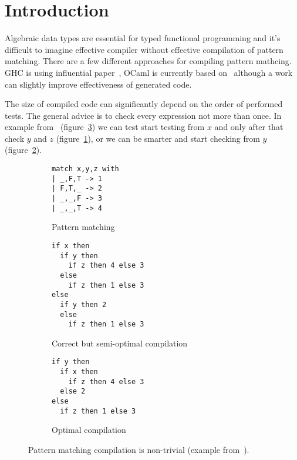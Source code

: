 \section{Introduction}

Algebraic data types are essential for typed functional programming and it's difficult to imagine effective compiler without effective compilation of pattern matching. 
There are a few different approaches for compiling pattern mathcing. GHC is using influential paper~\cite{Jones1987}, OCaml is currently based on~\cite{maranget2001} although a work~\cite{maranget2008} can slightly improve effectiveness of generated code. 

The size of compiled code can significantly depend on the order of performed tests.
The general advice is to check every expression not more than once. In example from~\cite{maranget2008} (figure~\ref{fig:match-example}) we can test start testing from $x$ and only after that check $y$ and $z$ (figure~\ref{fig:matching-example2}), or we can be smarter and start checking from $y$ (figure~\ref{fig:matching-example3}).


\begin{figure}[ht]
\begin{subfigure}[b]{0.2\linewidth}
\centering
\begin{lstlisting}
match x,y,z with
| _,F,T -> 1
| F,T,_ -> 2
| _,_,F -> 3
| _,_,T -> 4
\end{lstlisting}
\caption{Pattern matching}
\end{subfigure}
\hspace{0.5cm}
\begin{subfigure}[b]{0.32\linewidth}
\centering
\begin{lstlisting}
if x then
  if y then
    if z then 4 else 3
  else
    if z then 1 else 3
else
  if y then 2
  else
    if z then 1 else 3
\end{lstlisting}
\caption{Correct but semi-optimal compilation}
\label{fig:matching-example2}
\end{subfigure}
\hspace{0.5cm}
\begin{subfigure}[b]{0.35\linewidth}
\centering
\begin{lstlisting}
if y then
  if x then
    if z then 4 else 3
  else 2
else
  if z then 1 else 3
\end{lstlisting}
\caption{Optimal compilation}
\label{fig:matching-example3}
\end{subfigure}
\caption{Pattern matching compilation is non-trivial (example from~\cite{maranget2008}).}
\label{fig:match-example}
\end{figure}

